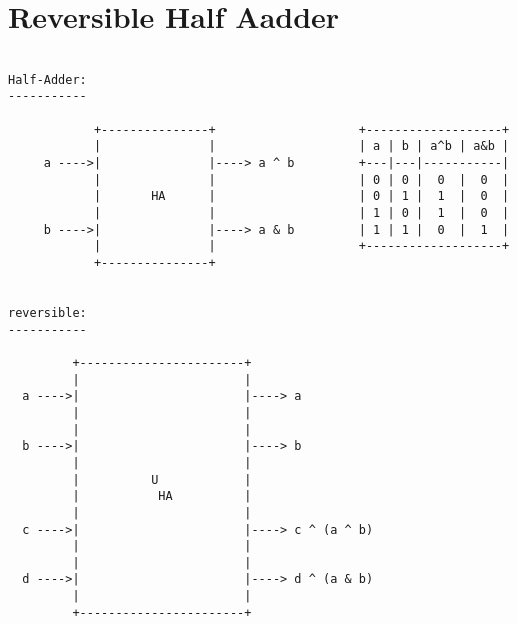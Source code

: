 \documentclass{article}
\begin{document}
\section{Reversible Half Aadder}

\begin{verbatim}

Half-Adder:
-----------

            +---------------+                    +-------------------+
            |               |                    | a | b | a^b | a&b |               
     a ---->|               |----> a ^ b         +---|---|-----------|               
            |               |                    | 0 | 0 |  0  |  0  |               
            |       HA      |                    | 0 | 1 |  1  |  0  |               
            |               |                    | 1 | 0 |  1  |  0  |               
     b ---->|               |----> a & b         | 1 | 1 |  0  |  1  |               
            |               |                    +-------------------+               
            +---------------+                                            


reversible:
-----------
                                                          
         +-----------------------+                                                  
         |                       |                                                  
  a ---->|                       |----> a                                           
         |                       |                                                  
         |                       |                                                  
  b ---->|                       |----> b                                           
         |                       |                                                  
         |          U            |                                                  
         |           HA          |
         |                       |
  c ---->|                       |----> c ^ (a ^ b)   
         |                       |
         |                       |
  d ---->|                       |----> d ^ (a & b)  
         |                       |
         +-----------------------+


\end{verbatim}
\end{document}
